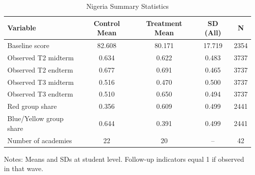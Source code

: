 \begin{table}[!htbp]
\centering
\caption{Nigeria Summary Statistics}
\label{tab:ng_sumstats}
\begin{threeparttable}
\begin{tabular}[t]{lcccc}
\toprule
Variable & Control Mean & Treatment Mean & SD (All) & N \\
\midrule
Baseline score &  82.608 &  80.171 &  17.719 & 2354 \\
Observed T2 midterm &   0.634 &   0.622 &   0.483 & 3737 \\
Observed T2 endterm &   0.677 &   0.691 &   0.465 & 3737 \\
Observed T3 midterm &   0.516 &   0.470 &   0.500 & 3737 \\
Observed T3 endterm &   0.510 &   0.650 &   0.494 & 3737 \\
Red group share &   0.356 &   0.609 &   0.499 & 2441 \\
Blue/Yellow group share &   0.644 &   0.391 &   0.499 & 2441 \\
Number of academies & 22 & 20 & -- & 42 \\
\bottomrule
\end{tabular}
\begin{tablenotes}[para]
\item Notes: Means and SDs at student level. Follow-up indicators equal 1 if observed in that wave.
\end{tablenotes}
\end{threeparttable}
\end{table}
